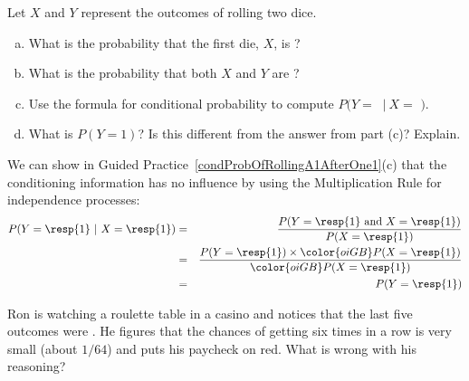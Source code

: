 \begin{exercisewrap}
\begin{nexercise} \label{condProbOfRollingA1AfterOne1}
Let $X$ and $Y$ represent the outcomes of rolling two dice.\footnotemark
\begin{enumerate}[(a)]
\item What is the probability that the first die, $X$, is ?
\item What is the probability that both $X$ and $Y$ are ?
\item Use the formula for conditional probability to compute $P(Y =$ $\ |\ X = $ $)$.
\item What is $P(Y=1)$? Is this different from the answer from part (c)? Explain.
\end{enumerate}
\end{nexercise}
\end{exercisewrap}

We can show in Guided Practice~\ref{condProbOfRollingA1AfterOne1}(c) that the conditioning information has no influence by using the Multiplication Rule for independence processes:
\begin{eqnarray*}
P(Y=\text{\resp{1}}\ |\ X=\text{\resp{1}})
	&=& \frac{P(Y=\text{\resp{1} and }X=\text{\resp{1}})}{P(X=\text{\resp{1}})} \\
	&=& \frac{P(Y=\text{\resp{1}})\times \color{oiGB}P(X=\text{\resp{1}})}{\color{oiGB}P(X=\text{\resp{1}})} \\
	&=& P(Y=\text{\resp{1}}) \\
\end{eqnarray*}

\begin{exercisewrap}
\begin{nexercise}
Ron is watching a roulette table in a casino and notices that the last five outcomes were . He figures that the chances of getting  six times in a row is very small (about $1/64$) and puts his paycheck on red. What is wrong with his reasoning?\footnotemark
\end{nexercise}
\end{exercisewrap}


